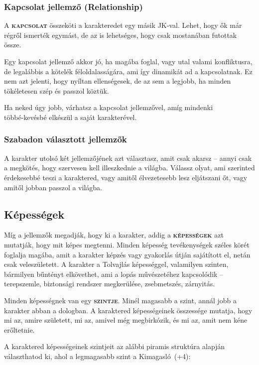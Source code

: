 \documentclass[oneside]{book}
\newcommand{\definition}[1]{\textbf{\textsc{#1}}}
\begin{document}
\subsubsection{Kapcsolat jellemző (Relationship)}

A \definition{kapcsolat} összeköti a karakteredet egy másik JK‑val. Lehet, hogy ők már régről ismerték egymást, de az is lehetséges, hogy csak mostanában futottak össze.

Egy kapcsolat jellemző akkor jó, ha magába foglal, vagy utal valami konfliktusra, de legalábbis a kötelék féloldalasságára, ami így dinamikát ad a kapcsolatnak. Ez nem azt jelenti, hogy nyíltan ellenségesek, de az sem a legjobb, ha minden tökéletesen szép és passzol köztük.

Ha neked úgy jobb, várhatsz a kapcsolat jellemzővel, amíg mindenki többé‑kevésbé elkészül a saját karakterével.

\subsubsection{Szabadon választott jellemzők}

A karakter utolsó két jellemzőjének azt választasz, amit csak akarsz – annyi csak a megkötés, hogy szervesen kell illeszkednie a világba. Válassz olyat, ami szerinted érdekesebbé teszi a karaktered, vagy amitől élvezetesebb lesz eljátszani őt, vagy amitől jobban passzol a világba.

\newpage

\subsection{Képességek}

Míg a jellemzők megadják, hogy ki a karakter, addig a \definition{képességek} azt mutatják, hogy mit képes megtenni. Minden képesség tevékenységek széles körét foglalja magába, amit a karakter képzés vagy gyakorlás útján sajátított el, netán csak veleszületett. A karakter a Tolvajlás képességgel, valamilyen szinten, bármilyen bűntényt elkövethet, ami a lopás művészetéhez kapcsolódik – terepszemle, biztonsági rendszer megkerülése, zsebmetszés, zárnyitás.

Minden képességnek van egy \definition{szintje}. Minél magasabb a szint, annál jobb a karakter abban a dologban. A karaktered képességeinek összessége mutatja, hogy mi az, amire született, mi az, amivel még megbirkózik, és mi az, amit nem kéne erőltetnie.

A karaktered képességeinek szintjeit az alábbi piramis struktúra alapján választhatod ki, ahol a legmagasabb szint a Kimagasló~(+4):
\end{document}
